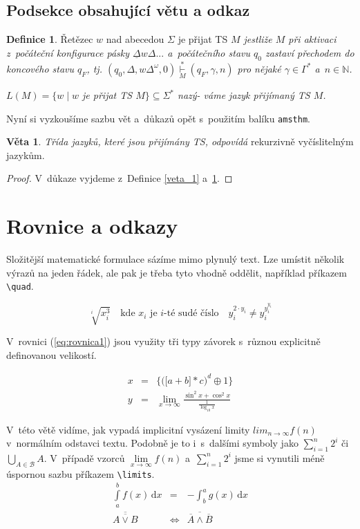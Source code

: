 \documentclass[a4paper, 11 pt, twocolumn]{article}
\theoremstyle{definition}
\newtheorem{theorem}{Definice}
\newtheorem{pov}{Věta}
\begin{document}
\subsection{Podsekce obsahující větu a odkaz}
\begin{theorem}
\label{veta_2}
Řetězec $w$ nad abecedou $\Sigma$ je přijat TS \emph{$M$
jestliže $M$ při aktivaci z~počáteční konfigurace pásky 
$\underline{\Delta}w\Delta...$ a~počátečního stavu $q_0$ zastaví
přechodem do koncového stavu $q_F$, tj. $(q_0,\Delta,w\Delta^\omega,0)\underset{M}{\overset{*}{\vdash}}(q_F,\gamma,n)$ pro nějaké $\gamma\in\Gamma^*$ a~$n\in\mathbb{N}$.}

\emph{$L(M)=\{w\;|\;w$ je přijat TS $M\} \subseteq \Sigma^*$ nazý-
váme jazyk přijímaný TS $M$.} 
\end{theorem}

Nyní si vyzkoušíme sazbu vět a~důkazů opět s~použitím
balíku \verb|amsthm|.


\begin{pov}
\emph{Třída jazyků, které jsou přijímány TS, odpovídá} rekurzivně vyčíslitelným jazykům.
\end{pov}

\begin{proof}
V~důkaze vyjdeme z~Definice \ref{veta_1} a~\ref{veta_2}.
\end{proof}

\section{Rovnice a odkazy}
Složitější matematické formulace sázíme mimo plynulý
text. Lze umístit několik výrazů na jeden řádek, ale pak je
třeba tyto vhodně oddělit, například příkazem \verb|\quad|.

$$\sqrt[i]{x^3_i} \quad \text{kde } x_i \text{ je } i\text{-té  sudé číslo}\quad y^{2\cdot y_i}_i \not=y_i^{y_i^{y_i}} $$

V~rovnici (\ref{eq:rovnica1}) jsou využity tři typy závorek s~různou explicitně definovanou velikostí.

\begin{eqnarray}
\label{eq:rovnica1}
	x & = &\bigg\{ \Big(\big[a + b\big] * c\Big)^d \oplus 1 \bigg\}\\
	y & = &\lim_{x\to\infty} \frac{\sin^2x + \cos^2x}{\frac{1}{\log_{10}x}} \nonumber
\end{eqnarray}

V~této větě vidíme, jak vypadá implicitní vysázení limity $lim_{n\to\infty}f(n)$v~normálním odstavci textu. Podobně je to i~s~dalšími symboly jako $\sum^{n}_{i=1} 2^{i}$
či $\bigcup_{A\in\mathcal{B}}A$. V~případě vzorců $\lim\limits_{x\to\infty} f(n)$ a~$\sum\limits_{i=1}^{n}2^{i}$ jsme si vynutili méně úspornou sazbu příkazem \verb|\limits|.
\begin{eqnarray}
\int\limits^b_a f(x) \, \mathrm{d}x & = & - \int^a_b g(x) \, \mathrm{d}x \\
\overline{\overline{A \vee B}} & \Leftrightarrow & \overline{\overline{A} \wedge \overline{B}}
\end{eqnarray}
\end{document}
